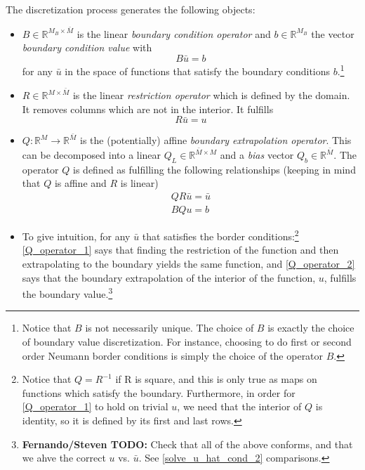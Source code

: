\documentclass[11pt]{article}
\newcommand{\R}{\ensuremath{\mathbb{R}}}
\begin{document}
	The discretization process generates the following objects:
	\begin{itemize}
		\item $B\in \R^{M_B \times \bar{M}}$ is the linear \textit{boundary condition operator} and $b \in \R^{M_B}$ the vector \textit{boundary condition value} with
		\begin{equation}
		B \bar{u} = b
		\label{B_operator_block}
		\end{equation}
		for any $\bar{u}$ in the space of functions that satisfy the boundary conditions $b$.\footnote{
Notice that $B$ is not necessarily unique. The choice of $B$ is exactly the choice of boundary value discretization. For instance, choosing to do first or second order Neumann border conditions is simply the choice of the operator $B$.}
		\item $R\in \R^{M\times \bar{M}}$ is the linear \textit{restriction operator} which is defined by the domain. It removes columns which are not in the interior. It fulfills
		\begin{equation}
		R \bar{u} = u \label{R_operator}
		\end{equation}
		
		\item $Q : \R^M \to \R^{\bar{M}}$ is the (potentially) affine \textit{boundary extrapolation operator}.  This can be decomposed into a linear $Q_L \in \R^{\bar{M}\times M}$ and a \textit{bias} vector $Q_b \in \R^{\bar{M}}$.  The operator $Q$ is defined as fulfilling the following relationships (keeping in mind that $Q$ is affine and $R$ is linear)
		\begin{align}
		Q  R\bar{u} = \bar{u}\label{Q_operator_1}\\
		B Q u  = b	\label{Q_operator_2}
	\end{align}
	\item To give intuition, for any $\bar{u}$ that satisfies the border conditions:\footnote{Notice that $Q = R^{-1}$ if R is square, and this is only true as maps on functions which satisfy the boundary.  Furthermore, in order for \cref{Q_operator_1} to hold on trivial $u$, we need that the interior of $Q$ is identity, so it is defined by its first and last rows.} \cref{Q_operator_1} says that finding the restriction of the function and then extrapolating to the boundary yields the same function, and \cref{Q_operator_2} says that the boundary extrapolation of the interior of the function, $u$, fulfills the boundary value.\footnote{
		\textbf{Fernando/Steven TODO:} Check that all of the above conforms, and that we ahve the correct $u$ vs. $\bar{u}$.  See \cref{solve_u_hat_cond_2} comparisons.}
		\end{itemize}
\end{document}
